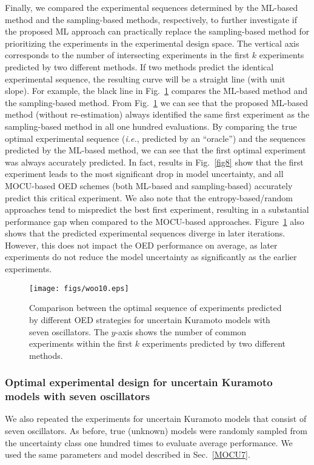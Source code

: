 \documentclass{article}
\begin{document}
Finally, we compared the experimental sequences determined by the ML-based method and the sampling-based methods, respectively, to further investigate if the proposed ML approach can practically replace the sampling-based method for prioritizing the experiments in the experimental design space. The vertical axis corresponds to the number of intersecting experiments in the first $k$ experiments predicted by two different methods. If two methods predict the identical experimental sequence, the resulting curve will be a straight line (with unit slope). For example, the black line in Fig.~\ref{fig10} compares the ML-based method and the sampling-based method. From Fig.~\ref{fig10} we can see that the proposed ML-based method (without re-estimation) always identified the same first experiment as the sampling-based method in all one hundred evaluations. By comparing the true optimal experimental sequence (\textit{i.e.}, predicted by an ``oracle'') and the sequences predicted by the ML-based method, we can see that the first optimal experiment was always accurately predicted. In fact, results in Fig.~\ref{fig8} show that the first experiment leads to the most significant drop in model uncertainty, and all MOCU-based OED schemes (both ML-based and sampling-based) accurately predict this critical experiment. We also note that the entropy-based/random approaches tend to mispredict the best first experiment, resulting in a substantial performance gap when compared to the MOCU-based approaches. Figure~\ref{fig10} also shows that the predicted experimental sequences diverge in later iterations. However, this does not impact the OED performance on average, as later experiments do not reduce the model uncertainty as significantly as the earlier experiments.

\begin{figure}
\centering
\texttt{[image: figs/woo10.eps]}
\caption{Comparison between the optimal sequence of experiments predicted by different OED strategies for uncertain Kuramoto models with seven oscillators. The $y$-axis shows the number of common experiments within the first $k$ experiments predicted by two different methods.}
\label{fig10}
\end{figure}

\subsubsection{Optimal experimental design for uncertain Kuramoto models with seven oscillators}
We also repeated the experiments for uncertain Kuramoto models that consist of seven oscillators. As before, true (unknown) models were randomly sampled from the uncertainty class one hundred times to evaluate average performance. We used the same parameters and model described in Sec.~\ref{MOCU7}. 
\end{document}
